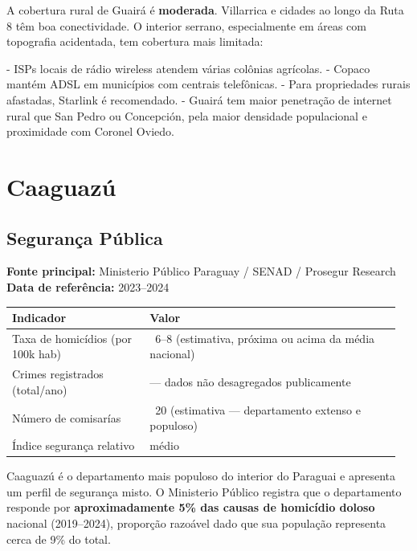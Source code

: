 A cobertura rural de Guairá é \textbf{moderada}. Villarrica e cidades ao longo da Ruta 8 têm boa conectividade. O interior serrano, especialmente em áreas com topografia acidentada, tem cobertura mais limitada:

- ISPs locais de rádio wireless atendem várias colônias agrícolas.
- Copaco mantém ADSL em municípios com centrais telefônicas.
- Para propriedades rurais afastadas, Starlink é recomendado.
- Guairá tem maior penetração de internet rural que San Pedro ou Concepción, pela maior densidade populacional e proximidade com Coronel Oviedo.





\clearpage
\section{Caaguazú}
\label{sec:dept_05_Caaguazu}

\subsection{Segurança Pública}

\textbf{Fonte principal:} Ministerio Público Paraguay / SENAD / Prosegur Research
\textbf{Data de referência:} 2023--2024


{\small
\setlength{\tabcolsep}{3pt}
\renewcommand{\arraystretch}{1.12}
\begin{tabularx}{\linewidth}{>{\raggedright\arraybackslash}p{0.34\linewidth} >{\raggedright\arraybackslash}p{0.62\linewidth}}
\toprule
Indicador & Valor \\
\midrule
Taxa de homicídios (por 100k hab) & ~6--8 (estimativa, próxima ou acima da média nacional) \\
Crimes registrados (total/ano) & --- dados não desagregados publicamente \\
Número de comisarías & ~20 (estimativa --- departamento extenso e populoso) \\
Índice segurança relativo & médio \\
\bottomrule
\end{tabularx}
}


Caaguazú é o departamento mais populoso do interior do Paraguai e apresenta um perfil de segurança misto. O Ministerio Público registra que o departamento responde por \textbf{aproximadamente 5\% das causas de homicídio doloso} nacional (2019--2024), proporção razoável dado que sua população representa cerca de 9\% do total.

